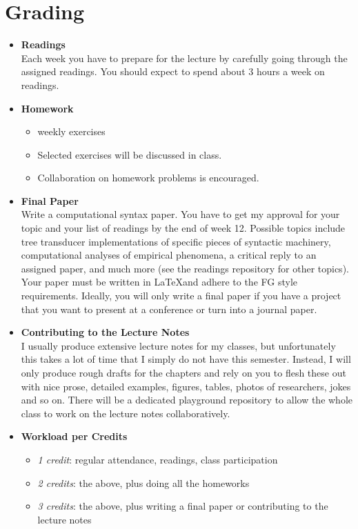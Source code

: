 \section{Grading}
\begin{itemize}
    \item \textbf{Readings}\\
        Each week you have to prepare for the lecture by carefully going through the assigned readings.
        You should expect to spend about 3 hours a week on readings.
    \item \textbf{Homework}
        \begin{itemize}
            \item weekly exercises
            \item Selected exercises will be discussed in class.
            \item Collaboration on homework problems is encouraged.
        \end{itemize}
    \item \textbf{Final Paper}\\
        Write a computational syntax paper.
        You have to get my approval for your topic and your list of readings by the end of week 12. 
        Possible topics include tree transducer implementations of specific pieces of syntactic machinery, computational analyses of empirical phenomena, a critical reply to an assigned paper, and much more (see the readings repository for other topics).
        Your paper must be written in \LaTeX and adhere to the FG style requirements.
        Ideally, you will only write a final paper if you have a project that you want to present at a conference or turn into a journal paper.
    \item \textbf{Contributing to the Lecture Notes}\\
        I usually produce extensive lecture notes for my classes, but unfortunately this takes a lot of time that I simply do not have this semester.
        Instead, I will only produce rough drafts for the chapters and rely on you to flesh these out with nice prose, detailed examples, figures, tables, photos of researchers, jokes and so on.
        There will be a dedicated playground repository to allow the whole class to work on the lecture notes collaboratively.
    \item \textbf{Workload per Credits}
        \begin{itemize}
            \item \emph{1 credit}: regular attendance, readings, class participation
            \item \emph{2 credits}: the above, plus doing all the homeworks
            \item \emph{3 credits}: the above, plus writing a final paper or contributing to the lecture notes
        \end{itemize}
\end{itemize}

